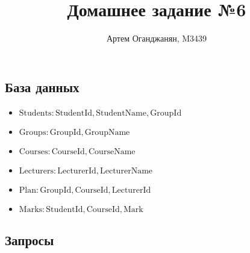 \documentclass{article}
\title{Домашнее задание №6}
\author{Артем Оганджанян, M3439}
\date{}
\newcommand{\Students}{\mathrm{Students}}
\newcommand{\StudentId}{\mathrm{StudentId}}
\newcommand{\StudentName}{\mathrm{StudentName}}
\newcommand{\Groups}{\mathrm{Groups}}
\newcommand{\GroupId}{\mathrm{GroupId}}
\newcommand{\GroupName}{\mathrm{GroupName}}
\newcommand{\Courses}{\mathrm{Courses}}
\newcommand{\CourseId}{\mathrm{CourseId}}
\newcommand{\CourseName}{\mathrm{CourseName}}
\newcommand{\Plan}{\mathrm{Plan}}
\newcommand{\Lecturers}{\mathrm{Lecturers}}
\newcommand{\LecturerId}{\mathrm{LecturerId}}
\newcommand{\LecturerName}{\mathrm{LecturerName}}
\newcommand{\Marks}{\mathrm{Marks}}
\newcommand{\Mark}{\mathrm{Mark}}
\begin{document}
\renewcommand{\count}{\operatorname{count}}

\maketitle

\subsection{\texorpdfstring{База данных}{DB}}

\begin{itemize}
    \item $\Students: \StudentId, \StudentName, \GroupId$
    \item $\Groups: \GroupId, \GroupName$
    \item $\Courses: \CourseId, \CourseName$
    \item $\Lecturers: \LecturerId, \LecturerName$
    \item $\Plan: \GroupId, \CourseId, \LecturerId$
    \item $\Marks: \StudentId, \CourseId, \Mark$
\end{itemize}

\subsection{\texorpdfstring{Запросы}{Queries}}
\end{document}
